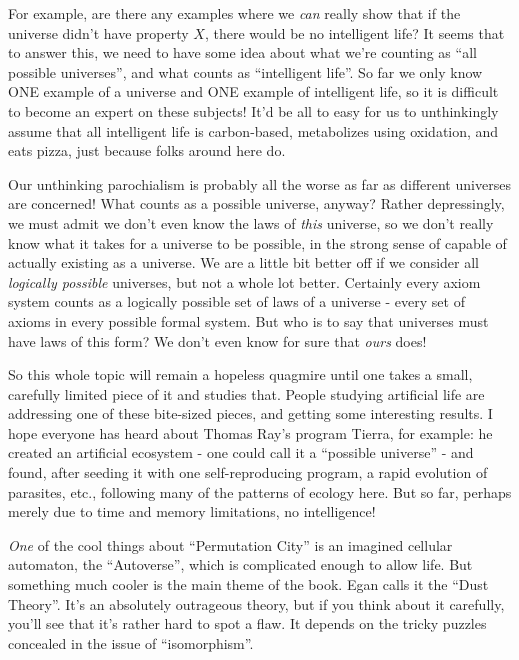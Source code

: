 \documentclass{article}
\begin{document}
For example, are there any examples where we \emph{can} really show that
if the universe didn't have property \(X\), there would be no
intelligent life? It seems that to answer this, we need to have some
idea about what we're counting as ``all possible universes'', and what
counts as ``intelligent life''. So far we only know ONE example of a
universe and ONE example of intelligent life, so it is difficult to
become an expert on these subjects! It'd be all to easy for us to
unthinkingly assume that all intelligent life is carbon-based,
metabolizes using oxidation, and eats pizza, just because folks around
here do.

Our unthinking parochialism is probably all the worse as far as
different universes are concerned! What counts as a possible universe,
anyway? Rather depressingly, we must admit we don't even know the laws
of \emph{this} universe, so we don't really know what it takes for a
universe to be possible, in the strong sense of capable of actually
existing as a universe. We are a little bit better off if we consider
all \emph{logically possible} universes, but not a whole lot better.
Certainly every axiom system counts as a logically possible set of laws
of a universe - every set of axioms in every possible formal system. But
who is to say that universes must have laws of this form? We don't even
know for sure that \emph{ours} does!

So this whole topic will remain a hopeless quagmire until one takes a
small, carefully limited piece of it and studies that. People studying
artificial life are addressing one of these bite-sized pieces, and
getting some interesting results. I hope everyone has heard about Thomas
Ray's program Tierra, for example: he created an artificial ecosystem -
one could call it a ``possible universe'' - and found, after seeding it
with one self-reproducing program, a rapid evolution of parasites, etc.,
following many of the patterns of ecology here. But so far, perhaps
merely due to time and memory limitations, no intelligence!

\emph{One} of the cool things about ``Permutation City'' is an imagined
cellular automaton, the ``Autoverse'', which is complicated enough to
allow life. But something much cooler is the main theme of the book.
Egan calls it the ``Dust Theory''. It's an absolutely outrageous theory,
but if you think about it carefully, you'll see that it's rather hard to
spot a flaw. It depends on the tricky puzzles concealed in the issue of
``isomorphism''.
\end{document}
